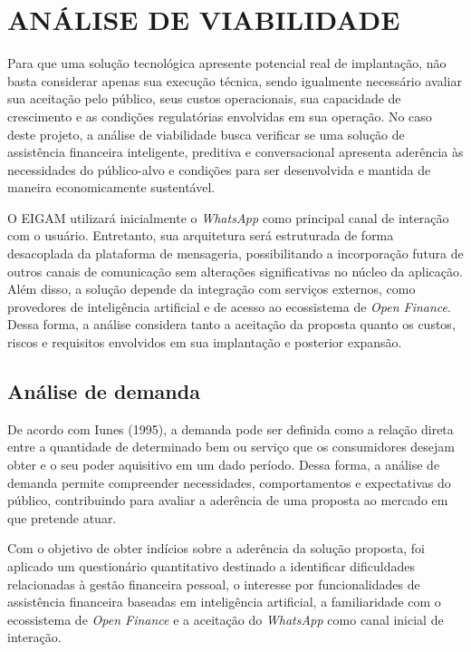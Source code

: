 \chapter{ANÁLISE DE VIABILIDADE}

Para que uma solução tecnológica apresente potencial real de implantação, não basta considerar apenas sua execução técnica, sendo igualmente necessário avaliar sua aceitação pelo público, seus custos operacionais, sua capacidade de crescimento e as condições regulatórias envolvidas em sua operação. No caso deste projeto, a análise de viabilidade busca verificar se uma solução de assistência financeira inteligente, preditiva e conversacional apresenta aderência às necessidades do público-alvo e condições para ser desenvolvida e mantida de maneira economicamente sustentável.

O EIGAM utilizará inicialmente o \textit{WhatsApp} como principal canal de interação com o usuário. Entretanto, sua arquitetura será estruturada de forma desacoplada da plataforma de mensageria, possibilitando a incorporação futura de outros canais de comunicação sem alterações significativas no núcleo da aplicação. Além disso, a solução depende da integração com serviços externos, como provedores de inteligência artificial e de acesso ao ecossistema de \textit{Open Finance}. Dessa forma, a análise considera tanto a aceitação da proposta quanto os custos, riscos e requisitos envolvidos em sua implantação e posterior expansão.


\section{Análise de demanda}

De acordo com Iunes (1995), a demanda pode ser definida como a relação direta entre a quantidade de determinado bem ou serviço que os consumidores desejam obter e o seu poder aquisitivo em um dado período. Dessa forma, a análise de demanda permite compreender necessidades, comportamentos e expectativas do público, contribuindo para avaliar a aderência de uma proposta ao mercado em que pretende atuar.

Com o objetivo de obter indícios sobre a aderência da solução proposta, foi aplicado um questionário quantitativo destinado a identificar dificuldades relacionadas à gestão financeira pessoal, o interesse por funcionalidades de assistência financeira baseadas em inteligência artificial, a familiaridade com o ecossistema de \textit{Open Finance} e a aceitação do \textit{WhatsApp} como canal inicial de interação.

